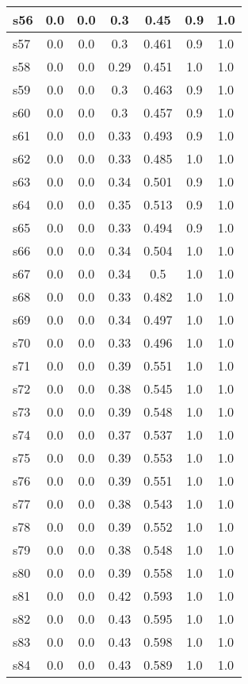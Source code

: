 \documentclass{article}
\begin{document}
\begin{tabular}{|l|c|c|c|c|c|c|}
\hline
s56 &0.0 & 0.0 & 0.3 & 0.45 & 0.9 & 1.0\\
\hline
s57 &0.0 & 0.0 & 0.3 & 0.461 & 0.9 & 1.0\\
\hline
s58 &0.0 & 0.0 & 0.29 & 0.451 & 1.0 & 1.0\\
\hline
s59 &0.0 & 0.0 & 0.3 & 0.463 & 0.9 & 1.0\\
\hline
s60 &0.0 & 0.0 & 0.3 & 0.457 & 0.9 & 1.0\\
\hline
s61 &0.0 & 0.0 & 0.33 & 0.493 & 0.9 & 1.0\\
\hline
s62 &0.0 & 0.0 & 0.33 & 0.485 & 1.0 & 1.0\\
\hline
s63 &0.0 & 0.0 & 0.34 & 0.501 & 0.9 & 1.0\\
\hline
s64 &0.0 & 0.0 & 0.35 & 0.513 & 0.9 & 1.0\\
\hline
s65 &0.0 & 0.0 & 0.33 & 0.494 & 0.9 & 1.0\\
\hline
s66 &0.0 & 0.0 & 0.34 & 0.504 & 1.0 & 1.0\\
\hline
s67 &0.0 & 0.0 & 0.34 & 0.5 & 1.0 & 1.0\\
\hline
s68 &0.0 & 0.0 & 0.33 & 0.482 & 1.0 & 1.0\\
\hline
s69 &0.0 & 0.0 & 0.34 & 0.497 & 1.0 & 1.0\\
\hline
s70 &0.0 & 0.0 & 0.33 & 0.496 & 1.0 & 1.0\\
\hline
s71 &0.0 & 0.0 & 0.39 & 0.551 & 1.0 & 1.0\\
\hline
s72 &0.0 & 0.0 & 0.38 & 0.545 & 1.0 & 1.0\\
\hline
s73 &0.0 & 0.0 & 0.39 & 0.548 & 1.0 & 1.0\\
\hline
s74 &0.0 & 0.0 & 0.37 & 0.537 & 1.0 & 1.0\\
\hline
s75 &0.0 & 0.0 & 0.39 & 0.553 & 1.0 & 1.0\\
\hline
s76 &0.0 & 0.0 & 0.39 & 0.551 & 1.0 & 1.0\\
\hline
s77 &0.0 & 0.0 & 0.38 & 0.543 & 1.0 & 1.0\\
\hline
s78 &0.0 & 0.0 & 0.39 & 0.552 & 1.0 & 1.0\\
\hline
s79 &0.0 & 0.0 & 0.38 & 0.548 & 1.0 & 1.0\\
\hline
s80 &0.0 & 0.0 & 0.39 & 0.558 & 1.0 & 1.0\\
\hline
s81 &0.0 & 0.0 & 0.42 & 0.593 & 1.0 & 1.0\\
\hline
s82 &0.0 & 0.0 & 0.43 & 0.595 & 1.0 & 1.0\\
\hline
s83 &0.0 & 0.0 & 0.43 & 0.598 & 1.0 & 1.0\\
\hline
s84 &0.0 & 0.0 & 0.43 & 0.589 & 1.0 & 1.0\\

\end{tabular}
\end{document}
